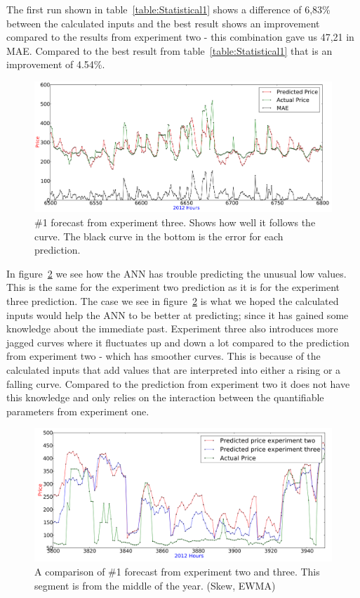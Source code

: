 The first run shown in table~\ref{table:Statistical1} shows a difference of 6,83\% between the calculated inputs and the best result shows an improvement compared to the results from experiment two - this combination gave us 47,21 in MAE. Compared to the best result from table~\ref{table:Statistical1} that is an improvement of 4.54\%.

\begin{figure}[H]
\centering
\includegraphics[width=\linewidth]{billeder/PriceExperimentalAnalysis/X3_Nr1_Best_skew_historical.png}
\caption{\#1 forecast from experiment three. Shows how well it follows the curve. The black curve in the bottom is the error for each prediction.}
\label{fig:X3_Best_With_MAE}
\end{figure}

In figure~\ref{fig:X2_X3_3800_4000} we see how the ANN has trouble predicting the unusual low values. This is the same for the experiment two prediction as it is for the experiment three prediction. The case we see in figure~\ref{fig:X2_X3_3800_4000} is what we hoped the calculated inputs would help the ANN to be better at predicting; since it has gained some knowledge about the immediate past. Experiment three also introduces more jagged curves where it fluctuates up and down a lot compared to the prediction from experiment two - which has smoother curves. This is because of the calculated inputs that add values that are interpreted into either a rising or a falling curve. Compared to the prediction from experiment two it does not have this knowledge and only relies on the interaction between the quantifiable parameters from experiment one.

\begin{figure}[H]
\centering
\includegraphics[width=\linewidth]{billeder/PriceExperimentalAnalysis/X2_X3_3800_4000.png}
\caption{A comparison of \#1 forecast from experiment two and three. This segment is from the middle of the year. (Skew, EWMA)}
\label{fig:X2_X3_3800_4000}
\end{figure}

